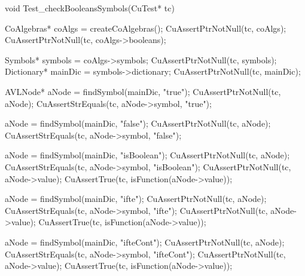 void Test_checkBooleansSymbols(CuTest* tc) {
  CoAlgebras* coAlgs = createCoAlgebras();
  CuAssertPtrNotNull(tc, coAlgs);
  CuAssertPtrNotNull(tc, coAlgs->booleans);

  Symbols* symbols = coAlgs->symbols;
  CuAssertPtrNotNull(tc, symbols);
  Dictionary* mainDic = symbols->dictionary;
  CuAssertPtrNotNull(tc, mainDic);

  AVLNode* aNode = findSymbol(mainDic, "true");
  CuAssertPtrNotNull(tc, aNode);
  CuAssertStrEquals(tc, aNode->symbol, "true");

  aNode = findSymbol(mainDic, "false");
  CuAssertPtrNotNull(tc, aNode);
  CuAssertStrEquals(tc, aNode->symbol, "false");

  aNode = findSymbol(mainDic, "isBoolean");
  CuAssertPtrNotNull(tc, aNode);
  CuAssertStrEquals(tc, aNode->symbol, "isBoolean");
  CuAssertPtrNotNull(tc, aNode->value);
  CuAssertTrue(tc, isFunction(aNode->value));

  aNode = findSymbol(mainDic, "ifte");
  CuAssertPtrNotNull(tc, aNode);
  CuAssertStrEquals(tc, aNode->symbol, "ifte");
  CuAssertPtrNotNull(tc, aNode->value);
  CuAssertTrue(tc, isFunction(aNode->value));

  aNode = findSymbol(mainDic, "ifteCont");
  CuAssertPtrNotNull(tc, aNode);
  CuAssertStrEquals(tc, aNode->symbol, "ifteCont");
  CuAssertPtrNotNull(tc, aNode->value);
  CuAssertTrue(tc, isFunction(aNode->value));
}

\stoptyping